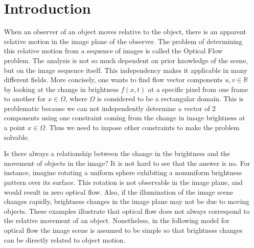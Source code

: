 \chapter{Introduction}
When an observer of an object moves relative to the object, there is an apparent relative motion in the image plane of the observer. The problem of determining this relative motion from a sequence of images is called the Optical Flow problem. The analysis is not so much dependent on prior knowledge of the scene, but on the image sequence itself. This independency makes it applicable in many different fields. More concisely, one wants to find flow vector components $u,v \in \mathbb{R}$ by looking at the change in brightness $f(x,t)$ at a specific pixel from one frame to another for $x \in \Omega$, where $\Omega$ is considered to be a rectangular domain. This is problematic because we can not independently determine a vector of 2 components using one constraint coming from the change in image brightness at a point $x \in \Omega$. Thus we need to impose other constraints to make the problem solvable.

Is there always a relationship between the change in the brightness and the movement of objects in the image? It is not hard to see that the answer is no. For instance, imagine rotating a uniform sphere exhibiting a nonuniform brightness pattern over its surface. This rotation is not observable in the image plane, and would result in zero optical flow. Also, if the illumination of the image scene changes rapidly, brightness changes in the image plane may not be due to moving objects. These examples illustrate that optical flow does not always correspond to the relative movement of an object. Nonetheless, in the following model for optical flow the image scene is assumed to be simple so that brightness changes can be directly related to object motion.    